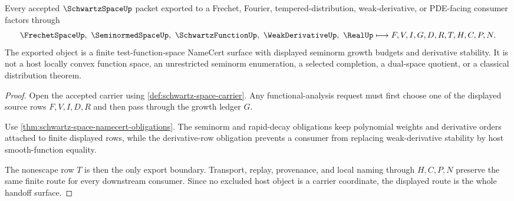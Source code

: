 \begin{theorem}
\label{thm:schwartz-space-functional-analysis-handoff}
Every accepted $\SchwartzSpaceUp$ packet exported to a Frechet, Fourier, tempered-distribution, weak-derivative, or PDE-facing consumer factors through
$$
\FrechetSpaceUp,\ \SeminormedSpaceUp,\ \SchwartzFunctionUp,\ \WeakDerivativeUp,\ \RealUp
\longmapsto
F,V,I,G,D,R,T,H,C,P,N .
$$
The exported object is a finite test-function-space NameCert surface with displayed seminorm growth budgets and derivative stability. It is not a host locally convex function space, an unrestricted seminorm enumeration, a selected completion, a dual-space quotient, or a classical distribution theorem.
\end{theorem}
\begin{proof}
Open the accepted carrier using \autoref{def:schwartz-space-carrier}. Any functional-analysis request must first choose one of the displayed source rows $F,V,I,D,R$ and then pass through the growth ledger $G$.

Use \autoref{thm:schwartz-space-namecert-obligations}. The seminorm and rapid-decay obligations keep polynomial weights and derivative orders attached to finite displayed rows, while the derivative-row obligation prevents a consumer from replacing weak-derivative stability by host smooth-function equality.

The nonescape row $T$ is then the only export boundary. Transport, replay, provenance, and local naming through $H,C,P,N$ preserve the same finite route for every downstream consumer. Since no excluded host object is a carrier coordinate, the displayed route is the whole handoff surface.
\end{proof}



